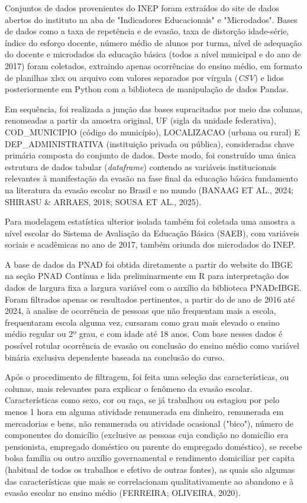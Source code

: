 \documentclass[english, spanish, brazilian]{RBIEarticle} %
\begin{document}
Conjuntos de dados provenientes do INEP foram extraídos do site de dados abertos do instituto na aba de "Indicadores Educacionais" e "Microdados". Bases de dados como a taxa de repetência e de evasão, taxa de distorção idade-série, índice do esforço docente, número médio de alunos por turma, nível de adequação do docente e microdados da educação básica (todos a nível municipal e do ano de 2017) foram coletados, extraindo apenas ocorrências do ensino médio, em formato de planilhas xlsx ou arquivo com valores separados por vírgula (\textit{CSV}) e lidos posteriormente em Python com a biblioteca de manipulação de dados Pandas.

Em sequência, foi realizada a junção das bases supracitadas por meio das colunas, renomeadas a partir da amostra original, UF (sigla da unidade federativa), COD\_MUNICIPIO (código do município), LOCALIZACAO (urbana ou rural) E DEP\_ADMINISTRATIVA (instituição privada ou pública), consideradas chave primária composta do conjunto de dados. Deste modo, foi construído uma única estrutura de dados tabular (\textit{dataframe}) contendo as variáveis institucionais relevantes à manifestação da evasão na fase final da educação básica fundamento na literatura da evasão escolar no Brasil e no mundo (BANAAG ET AL., 2024; SHIRASU \& ARRAES, 2018; SOUSA ET AL., 2025). 

Para modelagem estatística ulterior isolada também foi coletada uma amostra a nível escolar do Sistema de Avaliação da Educação Básica (SAEB), com variáveis sociais e acadêmicas no ano de 2017, também oriunda dos microdados do INEP.

A base de dados da PNAD foi obtida diretamente a partir do website do IBGE na seção PNAD Contínua e lida preliminarmente em R para interpretação dos dados de largura fixa a largura variável com o auxílio da biblioteca PNADcIBGE. Foram filtrados apenas os resultados pertinentes, a partir do de ano de 2016 até 2024, à analise de ocorrência de pessoas que não frequentam mais a escola, frequentaram escola alguma vez, cursaram como grau mais elevado o ensino médio regular ou 2º grau, e com idade até 18 anos. Com base nesses dados é possível rotular ocorrência de evasão ou conclusão do ensino médio como variável binária exclusiva dependente baseada na conclusão do curso.

Após o procedimento de filtragem, foi feita uma seleção das características, ou colunas, mais relevantes para explicar o fenômeno da evasão escolar. Características como sexo, cor ou raça, se já trabalhou ou estagiou por pelo menos 1 hora em alguma atividade remunerada em dinheiro, remunerada em mercadorias e bens, não remunerada ou atividade ocasional ("bico"), número de componentes do domicílio (exclusive as pessoas cuja condição no domicílio era pensionista, empregado doméstico ou parente do empregado doméstico), se recebe bolsa família ou outro auxílio governamental e rendimento domiciliar per capita
(habitual de todos os trabalhos e efetivo de outras fontes), as quais são algumas das características que mais se correlacionam qualitativamente ao abandono e à evasão escolar no ensino médio (FERREIRA; OLIVEIRA, 2020).
\end{document}
